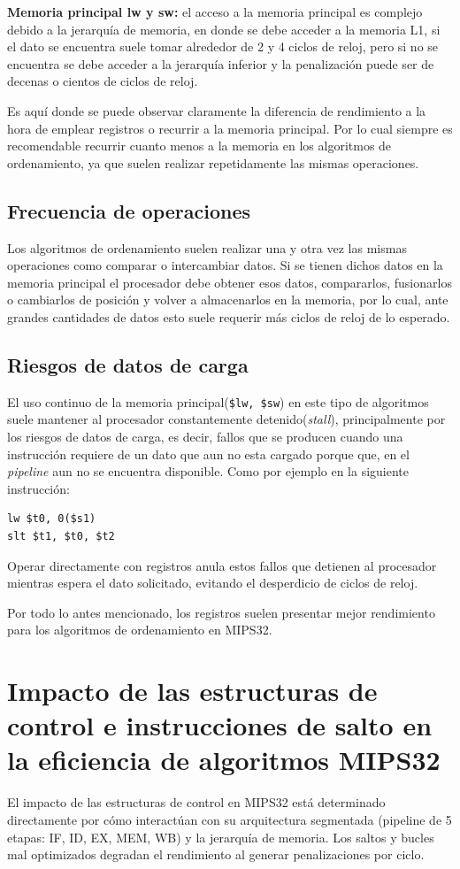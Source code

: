 \documentclass[12pt, a4paper]{article}
\begin{document}
            \textbf{Memoria principal lw y sw:} el acceso a la memoria principal es complejo debido a la jerarquía de memoria, en donde se debe acceder a la memoria L1, si el dato se encuentra suele tomar alrededor de 2 y 4 ciclos de reloj, pero si no se encuentra se debe acceder a la jerarquía inferior y la penalización puede ser de decenas o cientos de ciclos de reloj.

            Es aquí donde se puede observar claramente la diferencia de rendimiento a la hora de emplear registros o recurrir a la memoria principal. Por lo cual siempre es recomendable recurrir cuanto menos a la memoria en los algoritmos de ordenamiento, ya que suelen realizar repetidamente las mismas operaciones.
        \subsection{Frecuencia de operaciones}
            Los algoritmos de ordenamiento suelen realizar una y otra vez las mismas operaciones como comparar o intercambiar datos. Si se tienen dichos datos en la memoria principal el procesador debe obtener esos datos, compararlos, fusionarlos o cambiarlos de posición y volver a almacenarlos en la memoria, por lo cual, ante grandes cantidades de datos esto suele requerir más ciclos de reloj de lo esperado.
        \subsection{Riesgos de datos de carga}
            El uso continuo de la memoria principal(\lstinline|$lw, $sw|) en este tipo de algoritmos suele mantener al procesador constantemente detenido(\textit{stall}), principalmente por los riesgos de datos de carga, es decir, fallos que se producen cuando una instrucción requiere de un dato que aun no esta cargado porque que, en el \textit{pipeline} aun no se encuentra disponible. Como por ejemplo en la siguiente instrucción:
            \begin{lstlisting}
lw $t0, 0($s1)
slt $t1, $t0, $t2
            \end{lstlisting}
            Operar directamente con registros anula estos fallos que detienen al procesador mientras espera el dato solicitado, evitando el desperdicio de ciclos de reloj.

    Por todo lo antes mencionado, los registros suelen presentar mejor rendimiento para los algoritmos de ordenamiento en MIPS32.
    \section{Impacto de las estructuras de control e instrucciones de salto en la eficiencia de algoritmos MIPS32}
        El impacto de las estructuras de control en MIPS32 está determinado directamente por cómo interactúan con su arquitectura segmentada (pipeline de 5 etapas: IF, ID, EX, MEM, WB) y la jerarquía de memoria. Los saltos y bucles mal optimizados degradan el rendimiento al generar penalizaciones por ciclo.
\end{document}
